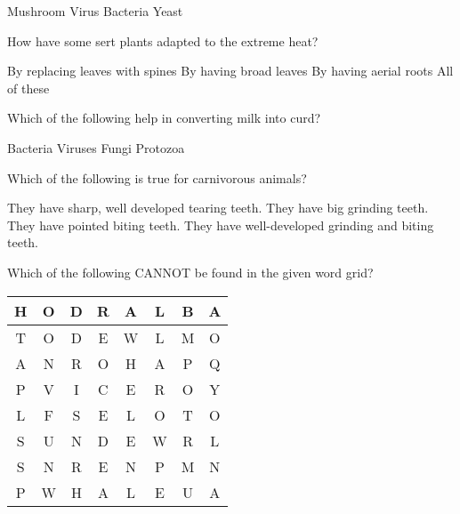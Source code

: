 \begin{questions}
    \begin{randomizeoneparchoices}
        \CorrectChoice Mushroom
        \choice Virus
        \choice Bacteria
        \choice Yeast
    \end{randomizeoneparchoices}

    \question How have some sert plants adapted to the extreme heat?

    \begin{randomizechoices}
        \CorrectChoice By replacing leaves with spines
        \choice By having broad leaves
        \choice By having aerial roots
        \choice All of these
    \end{randomizechoices}

    \question Which of the following help in converting milk into curd?

    \begin{randomizeoneparchoices}
        \CorrectChoice Bacteria
        \choice Viruses
        \choice Fungi
        \choice Protozoa
    \end{randomizeoneparchoices}

    \question Which of the following is true for carnivorous animals?

    \begin{randomizechoices}
        \CorrectChoice They have sharp, well developed tearing teeth.
        \choice They have big grinding teeth.
        \choice They have pointed biting teeth.
        \choice They have well-developed grinding and biting teeth.
    \end{randomizechoices}

    \question Which of the following CANNOT be found in the given word grid?

    \begin{center}
        \begin{tabular}{|*{8}{c|}}
            \hline
            H & O & D & R & A & L & B & A \\
            \hline
            T & O & D & E & W & L & M & O \\
            \hline
            A & N & R & O & H & A & P & Q \\
            \hline
            P & V & I & C & E & R & O & Y \\
            \hline
            L & F & S & E & L & O & T & O \\
            \hline
            S & U & N & D & E & W & R & L \\
            \hline
            S & N & R & E & N & P & M & N \\
            \hline
            P & W & H & A & L & E & U & A \\
            \hline
        \end{tabular}
    \end{center}


\end{questions}
